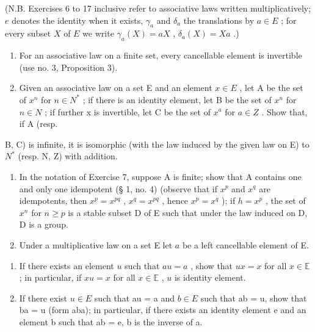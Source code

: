 (N.B. Exercises 6 to 17 inclusive refer to associative laws written multiplicatively; \(e\) denotes the identity when it exists, \(\gamma_a\) and \(\delta_a\) the translations by \(a \in E\) ; for every subset \(X\) of \(E\) we write \(\gamma_a(X) = aX\) , \(\delta_a(X) = Xa\) .)

\begin{enumerate}
\def\labelenumi{\arabic{enumi}.}
\setcounter{enumi}{5}
\item
  For an associative law on a finite set, every cancellable element is invertible (use no. 3, Proposition 3).
\item
  Given an associative law on a set E and an element \(x \in E\) , let A be the set of \(x^{n}\) for \(n \in N^{*}\) ; if there is an identity element, let B be the set of \(x^{n}\) for \(n \in N\) ; if further x is invertible, let C be the set of \(x^{a}\) for \(a \in Z\) . Show that, if A (resp.
\end{enumerate}

B, C) is infinite, it is isomorphic (with the law induced by the given law on E) to \(N^{*}\) (resp. N, Z) with addition.

\begin{enumerate}
\def\labelenumi{\arabic{enumi}.}
\setcounter{enumi}{7}
\item
  In the notation of Exercise 7, suppose A is finite; show that A contains one and only one idempotent (§ 1, no. 4) (observe that if \(x^p\) and \(x^q\) are idempotents, then \(x^p = x^{pq}\) , \(x^q = x^{pq}\) , hence \(x^p = x^q\) ); if \(h = x^p\) , the set of \(x^n\) for \(n \geqslant p\) is a stable subset D of E such that under the law induced on D, D is a group.
\item
  Under a multiplicative law on a set E let \(a\) be a left cancellable element of E.
\end{enumerate}

\begin{enumerate}
\def\labelenumi{(\alph{enumi})}
\item
  If there exists an element \(u\) such that \(au = a\) , show that \(ux = x\) for all \(x \in \mathbb{E}\) ; in particular, if \(xu = x\) for all \(x \in \mathbb{E}\) , \(u\) is identity element.
\item
  If there exist \(u \in E\) such that au = a and \(b \in E\) such that ab = u, show that ba = u (form aba); in particular, if there exists an identity element e and an element b such that ab = e, b is the inverse of a.
\end{enumerate}


